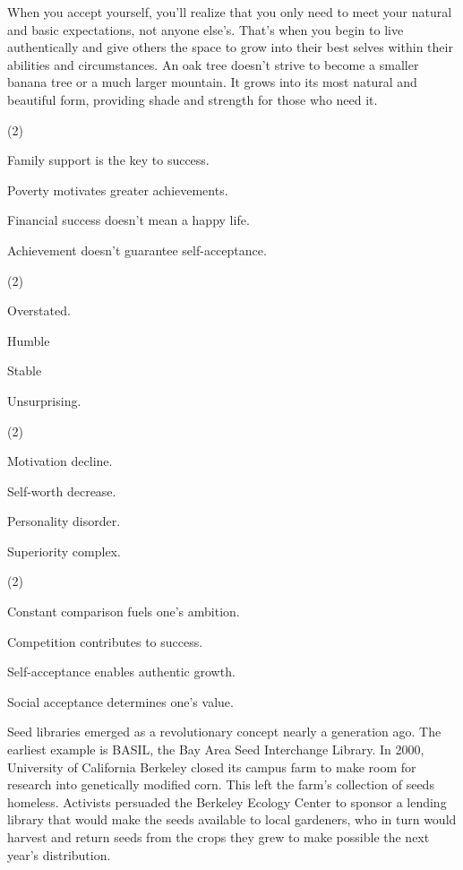 \documentclass{英语试卷}
\begin{document}
\par When you accept yourself, you'll realize that you only need to meet your natural and basic expectations, not anyone else's. That's when you begin to live authentically and give others the space to grow into their best selves within their abilities and circumstances. An oak tree doesn't strive to become a smaller banana tree or a much larger mountain. It grows into its most natural and beautiful form, providing shade and strength for those who need it.\par
{}
\begin{choices}(2)
  \item Family support is the key to success.
  \item Poverty motivates greater achievements.
  \item Financial success doesn't mean a happy life.
  \item Achievement doesn't guarantee self-acceptance.
\end{choices}
\begin{choices}(2)
  \item Overstated.
  \item Humble
  \item Stable
  \item Unsurprising.
\end{choices}
\begin{choices}(2)
  \item Motivation decline.
  \item Self-worth decrease.
  \item Personality disorder.
  \item Superiority complex.
\end{choices}
\begin{choices}(2)
  \item Constant comparison fuels one's ambition.
  \item Competition contributes to success.
  \item Self-acceptance enables authentic growth.
  \item Social acceptance determines one's value.
\end{choices}
\par Seed libraries emerged as a revolutionary concept nearly a generation ago. The earliest example is BASIL, the Bay Area Seed Interchange Library. In 2000, University of California Berkeley closed its campus farm to make room for research into genetically modified corn. This left the farm's collection of seeds homeless. Activists persuaded the Berkeley Ecology Center to sponsor a lending library that would make the seeds available to local gardeners, who in turn would harvest and return seeds from the crops they grew to make possible the next year's distribution.\par
\end{document}
